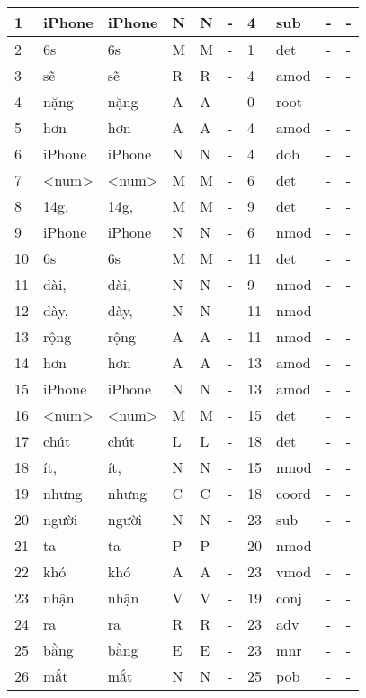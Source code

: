 \begin{tabular}{ | l | l | l | l | l | l | l | l | l | l | }
\hline
	1 & iPhone & iPhone & N & N & - & 4 & sub & - & - \\ \hline
	2 & 6s & 6s & M & M & - & 1 & det & - & - \\ \hline
	3 & sẽ & sẽ & R & R & - & 4 & amod & - & - \\ \hline
	4 & nặng & nặng & A & A & - & 0 & root & - & - \\ \hline
	5 & hơn & hơn & A & A & - & 4 & amod & - & - \\ \hline
	6 & iPhone & iPhone & N & N & - & 4 & dob & - & - \\ \hline
	7 & <num> & <num> & M & M & - & 6 & det & - & - \\ \hline
	8 & 14g, & 14g, & M & M & - & 9 & det & - & - \\ \hline
	9 & iPhone & iPhone & N & N & - & 6 & nmod & - & - \\ \hline
	10 & 6s & 6s & M & M & - & 11 & det & - & - \\ \hline
	11 & dài, & dài, & N & N & - & 9 & nmod & - & - \\ \hline
	12 & dày, & dày, & N & N & - & 11 & nmod & - & - \\ \hline
	13 & rộng & rộng & A & A & - & 11 & nmod & - & - \\ \hline
	14 & hơn & hơn & A & A & - & 13 & amod & - & - \\ \hline
	15 & iPhone & iPhone & N & N & - & 13 & amod & - & - \\ \hline
	16 & <num> & <num> & M & M & - & 15 & det & - & - \\ \hline
	17 & chút & chút & L & L & - & 18 & det & - & - \\ \hline
	18 & ít, & ít, & N & N & - & 15 & nmod & - & - \\ \hline
	19 & nhưng & nhưng & C & C & - & 18 & coord & - & - \\ \hline
	20 & người & người & N & N & - & 23 & sub & - & - \\ \hline
	21 & ta & ta & P & P & - & 20 & nmod & - & - \\ \hline
	22 & khó & khó & A & A & - & 23 & vmod & - & - \\ \hline
	23 & nhận & nhận & V & V & - & 19 & conj & - & - \\ \hline
	24 & ra & ra & R & R & - & 23 & adv & - & - \\ \hline
	25 & bằng & bằng & E & E & - & 23 & mnr & - & - \\ \hline
	26 & mắt & mắt & N & N & - & 25 & pob & - & - \\ \hline

\end{tabular}
